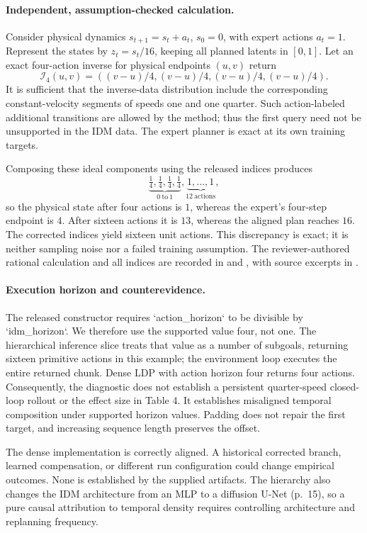 \documentclass[10pt]{article}
\begin{document}
\paragraph*{Independent, assumption-checked calculation.}\mbox{}\par
Consider physical dynamics \(s_{t+1}=s_t+a_t\), \(s_0=0\), with expert actions \(a_t=1\). Represent the states by \(z_t=s_t/16\), keeping all planned latents in \([0,1]\). Let an exact four-action inverse for physical endpoints \((u,v)\) return \[\mathcal{I}_4(u,v)=\left((v-u)/4,(v-u)/4,(v-u)/4,(v-u)/4\right).\] It is sufficient that the inverse-data distribution include the corresponding constant-velocity segments of speeds one and one quarter. Such action-labeled additional transitions are allowed by the method; thus the first query need not be unsupported in the IDM data. The expert planner is exact at its own training targets.\par
Composing these ideal components using the released indices produces \[\underbrace{\tfrac14,\tfrac14,\tfrac14,\tfrac14}_{0\ \mathrm{to}\ 1},
 \underbrace{1,\ldots,1}_{12\ \mathrm{actions}},\] so the physical state after four actions is \(1\), whereas the expert’s four-step endpoint is \(4\). After sixteen actions it is \(13\), whereas the aligned plan reaches \(16\). The corrected indices yield sixteen unit actions. This discrepancy is exact; it is neither sampling noise nor a failed training assumption. The reviewer-authored rational calculation and all indices are recorded in and , with source excerpts in .\par
\paragraph*{Execution horizon and counterevidence.}\mbox{}\par
The released constructor requires `action\_horizon` to be divisible by `idm\_horizon`. We therefore use the supported value four, not one. The hierarchical inference slice treats that value as a number of subgoals, returning sixteen primitive actions in this example; the environment loop executes the entire returned chunk. Dense LDP with action horizon four returns four actions. Consequently, the diagnostic does not establish a persistent quarter-speed closed-loop rollout or the effect size in Table 4. It establishes misaligned temporal composition under supported horizon values. Padding does not repair the first target, and increasing sequence length preserves the offset.\par
The dense implementation is correctly aligned. A historical corrected branch, learned compensation, or different run configuration could change empirical outcomes. None is established by the supplied artifacts. The hierarchy also changes the IDM architecture from an MLP to a diffusion U-Net (p. 15), so a pure causal attribution to temporal density requires controlling architecture and replanning frequency.\par
\end{document}

